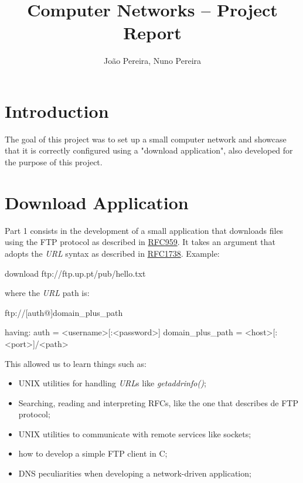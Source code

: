 \documentclass[11pt,a4paper,twocolumn]{article}
\title{Computer Networks -- \nth{2} Project Report}
\author{João Pereira, Nuno Pereira}
\begin{document}
\maketitle

\section{Introduction}

The goal of this project was to set up a small computer network and showcase that it is correctly configured using a "download application", also developed for the purpose of this project.

\section{Download Application}

Part 1 consists in the development of a small application that downloads files using the FTP protocol as described in \href{https://www.rfc-editor.org/rfc/rfc959}{RFC959}.
It takes an argument that adopts the \textit{URL} syntax as described in \href{https://www.rfc-editor.org/rfc/rfc1738}{RFC1738}. Example:

\begin{code-bash}
download ftp://ftp.up.pt/pub/hello.txt
\end{code-bash}

where the \textit{URL} path is:

\begin{code-bash}
ftp://[auth@]domain_plus_path

having:
    auth = <username>[:<password>]
    domain_plus_path = <host>[:<port>]/<path>
\end{code-bash}

This allowed us to learn things such as:
\begin{itemize}
    \item UNIX utilities for handling \textit{URL}s like \textit{getaddrinfo()};
    \item Searching, reading and interpreting RFCs, like the one that describes de FTP protocol;
    \item UNIX utilities to communicate with remote services like sockets;
    \item how to develop a simple FTP client in C;
    \item DNS peculiarities when developing a network-driven application;
\end{itemize}
\end{document}
